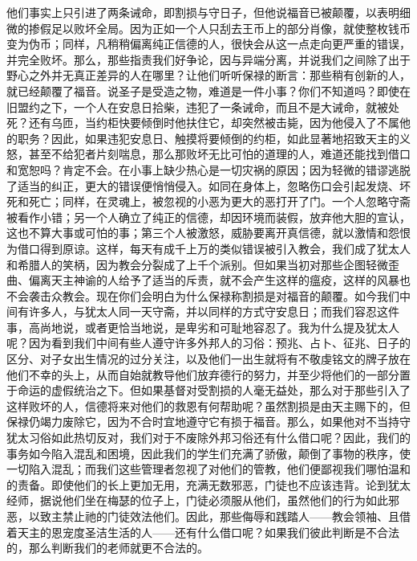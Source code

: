 他们事实上只引进了两条诫命，即割损与守日子，但他说福音已被颠覆，以表明细微的掺假足以败坏全局。因为正如一个人只刮去王币上的部分肖像，就使整枚钱币变为伪币；同样，凡稍稍偏离纯正信德的人，很快会从这一点走向更严重的错误，并完全败坏。那么，那些指责我们好争论，因与异端分离，并说我们之间除了出于野心之外并无真正差异的人在哪里？让他们听听保禄的断言：那些稍有创新的人，就已经颠覆了福音。说圣子是受造之物，难道是一件小事？你们不知道吗？即使在旧盟约之下，一个人在安息日拾柴，违犯了一条诫命，而且不是大诫命，就被处死？还有乌匝，当约柜快要倾倒时他扶住它，却突然被击毙，因为他侵入了不属他的职务？因此，如果违犯安息日、触摸将要倾倒的约柜，如此显著地招致天主的义怒，甚至不给犯者片刻喘息，那么那败坏无比可怕的道理的人，难道还能找到借口和宽恕吗？肯定不会。在小事上缺少热心是一切灾祸的原因；因为轻微的错谬逃脱了适当的纠正，更大的错误便悄悄侵入。如同在身体上，忽略伤口会引起发烧、坏死和死亡；同样，在灵魂上，被忽视的小恶为更大的恶打开了门。一个人忽略守斋被看作小错；另一个人确立了纯正的信德，却因环境而装假，放弃他大胆的宣认，这也不算大事或可怕的事；第三个人被激怒，威胁要离开真信德，就以激情和怨恨为借口得到原谅。这样，每天有成千上万的类似错误被引入教会，我们成了犹太人和希腊人的笑柄，因为教会分裂成了上千个派别。但如果当初对那些企图轻微歪曲、偏离天主神谕的人给予了适当的斥责，就不会产生这样的瘟疫，这样的风暴也不会袭击众教会。现在你们会明白为什么保禄称割损是对福音的颠覆。如今我们中间有许多人，与犹太人同一天守斋，并以同样的方式守安息日；而我们容忍这件事，高尚地说，或者更恰当地说，是卑劣和可耻地容忍了。我为什么提及犹太人呢？因为看到我们中间有些人遵守许多外邦人的习俗：预兆、占卜、征兆、日子的区分、对子女出生情况的过分关注，以及他们一出生就将有不敬虔铭文的牌子放在他们不幸的头上，从而自始就教导他们放弃德行的努力，并至少将他们的一部分置于命运的虚假统治之下。但如果基督对受割损的人毫无益处，那么对于那些引入了这样败坏的人，信德将来对他们的救恩有何帮助呢？虽然割损是由天主赐下的，但保禄仍竭力废除它，因为不合时宜地遵守它有损于福音。那么，如果他对不当持守犹太习俗如此热切反对，我们对于不废除外邦习俗还有什么借口呢？因此，我们的事务如今陷入混乱和困境，因此我们的学生们充满了骄傲，颠倒了事物的秩序，使一切陷入混乱；而我们这些管理者忽视了对他们的管教，他们便鄙视我们哪怕温和的责备。即使他们的长上更加无用，充满无数邪恶，门徒也不应该违背。论到犹太经师，据说他们坐在梅瑟的位子上，门徒必须服从他们，虽然他们的行为如此邪恶，以致主禁止祂的门徒效法他们。因此，那些侮辱和践踏人——教会领袖、且借着天主的恩宠度圣洁生活的人——还有什么借口呢？如果我们彼此判断是不合法的，那么判断我们的老师就更不合法的。\par

